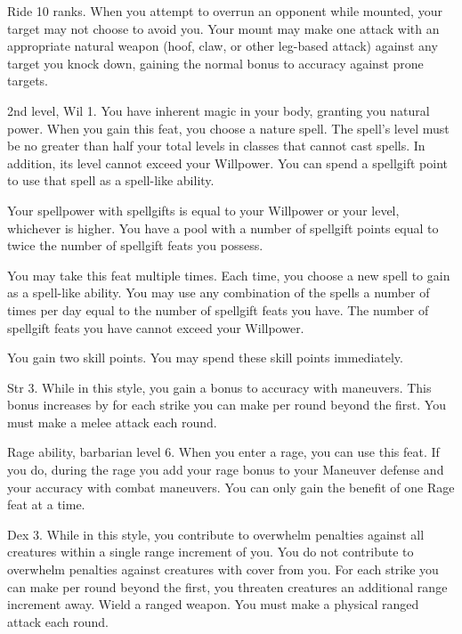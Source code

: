 \featpre Ride 10 ranks.
\featben When you attempt to overrun an opponent while mounted, your target may not choose to avoid you.
Your mount may make one attack with an appropriate natural weapon (hoof, claw, or other leg-based attack) against any target you knock down, gaining the normal  bonus to accuracy against prone targets.

\featpres 2nd level, Wil 1.
\featben You have inherent magic in your body, granting you natural power.
When you gain this feat, you choose a nature spell.
The spell's level must be no greater than half your total levels in classes that cannot cast spells.
In addition, its level cannot exceed your Willpower.
You can spend a spellgift point to use that spell as a spell-like ability.

Your spellpower with spellgifts is equal to your Willpower or your level, whichever is higher.
You have a pool with a number of spellgift points equal to twice the number of spellgift feats you possess.

You may take this feat multiple times.
Each time, you choose a new spell to gain as a spell-like ability.
You may use any combination of the spells a number of times per day equal to the number of spellgift feats you have.
The number of spellgift feats you have cannot exceed your Willpower.

\featben You gain two skill points.
You may spend these skill points immediately.

\featpre Str 3.
\featben While in this style, you gain a  bonus to accuracy with maneuvers.
This bonus increases by  for each strike you can make per round beyond the first.
\stylereq You must make a melee attack each round.

\featpres Rage ability, barbarian level 6.
\featben When you enter a rage, you can use this feat. If you do, during the rage you add your rage bonus to your Maneuver defense and your accuracy with combat maneuvers.
 You can only gain the benefit of one Rage feat at a time.

\featpre Dex 3.
\featben While in this style, you contribute to overwhelm penalties against all creatures within a single range increment of you.
You do not contribute to overwhelm penalties against creatures with cover from you.
For each strike you can make per round beyond the first, you threaten creatures an additional range increment away.
\stylereq Wield a ranged weapon.
You must make a physical ranged attack each round.


